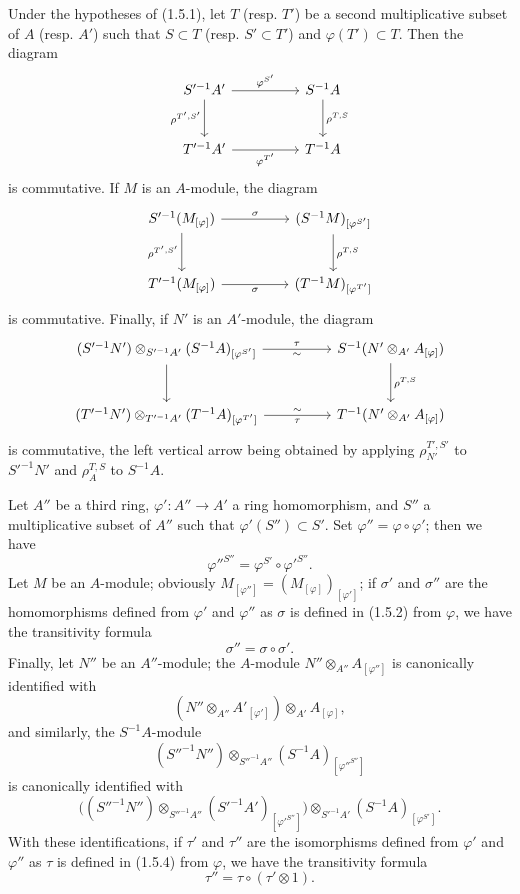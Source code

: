\begin{env}[1.5.6]
\label{0.1.5.6}
Under the hypotheses of (1.5.1), let $T$ (resp. $T'$) be a second multiplicative
subset of $A$ (resp. $A'$) such that $S\subset T$ (resp. $S'\subset T'$)
and $\varphi(T')\subset T$. Then the diagram
\[
\begin{tikzcd}[column sep=huge,row sep=large]
S'^{-1}A' \arrow[r,"\varphi^{S'}"] \arrow[d,"\rho^{T',S'}"']
  & S^{-1}A \arrow[d,"\rho^{T,S}"] \\
T'^{-1}A' \arrow[r,"\varphi^{T'}"']
  & T^{-1}A
\end{tikzcd}
\]
is commutative. If $M$ is an $A$-module, the diagram
\[
\begin{tikzcd}[column sep=huge,row sep=large]
S'^{-1}(M_{[\varphi]}) \arrow[r,"\sigma"] \arrow[d,"\rho^{T',S'}"']
  & (S^{-1}M)_{[\varphi^{S'}]} \arrow[d,"\rho^{T,S}"] \\
T'^{-1}(M_{[\varphi]}) \arrow[r,"\sigma"']
  & (T^{-1}M)_{[\varphi^{T'}]}
\end{tikzcd}
\]
is commutative. Finally, if $N'$ is an $A'$-module, the diagram
\[
\begin{tikzcd}[column sep=huge,row sep=large]
(S'^{-1}N')\otimes_{S'^{-1}A'}(S^{-1}A)_{[\varphi^{S'}]}
  \arrow[r,"\tau","{\sim}"'] \arrow[d]
  & S^{-1}(N'\otimes_{A'}A_{[\varphi]}) \arrow[d,"\rho^{T,S}"] \\
(T'^{-1}N')\otimes_{T'^{-1}A'}(T^{-1}A)_{[\varphi^{T'}]}
  \arrow[r,"\tau"',"{\sim}"]
  & T^{-1}(N'\otimes_{A'}A_{[\varphi]})
\end{tikzcd}
\]
is commutative, the left vertical arrow being obtained by applying
$\rho_{N'}^{T',S'}$ to $S'^{-1}N'$ and $\rho_A^{T,S}$ to $S^{-1}A$.
\end{env}


\begin{env}[1.5.7]
\label{0.1.5.7}
Let $A''$ be a third ring, $\varphi':A''\to A'$ a ring
homomorphism, and $S''$ a multiplicative subset of $A''$ such that
$\varphi'(S'')\subset S'$. Set $\varphi''=\varphi\circ\varphi'$; then we have
\[
  \varphi''^{S''}=\varphi^{S'}\circ\varphi'^{S''}.
\]
Let $M$ be an $A$-module; obviously
$M_{[\varphi'']}=(M_{[\varphi]})_{[\varphi']}$; if $\sigma'$ and $\sigma''$ are
the homomorphisms defined from $\varphi'$ and $\varphi''$ as $\sigma$
is defined in (1.5.2) from $\varphi$, we have the transitivity formula
\[
  \sigma''=\sigma\circ\sigma'.
\]
Finally, let $N''$ be an $A''$-module; the $A$-module
$N''\otimes_{A''}A_{[\varphi'']}$ is canonically identified with
\[
  (N''\otimes_{A''}A'_{[\varphi']})\otimes_{A'}A_{[\varphi]},
\]
and similarly, the $S^{-1}A$-module
\[
  (S''^{-1}N'')\otimes_{S''^{-1}A''}
  (S^{-1}A)_{[\varphi''^{S''}]}
\]
is canonically identified with
\[
  \bigl((S''^{-1}N'')\otimes_{S''^{-1}A''}
  (S'^{-1}A')_{[\varphi'^{S''}]}\bigr)
  \otimes_{S'^{-1}A'}(S^{-1}A)_{[\varphi^{S'}]}.
\]
With these identifications, if $\tau'$ and $\tau''$ are the isomorphisms defined
from $\varphi'$ and $\varphi''$ as $\tau$ is defined in (1.5.4) from
$\varphi$, we have the transitivity formula
\[
  \tau''=\tau\circ(\tau'\otimes 1).
\]
\end{env}

